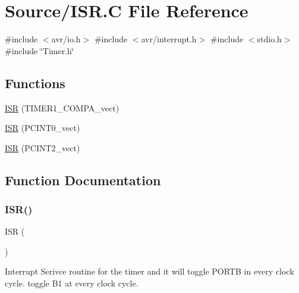\hypertarget{_i_s_r_8_c}{}\section{Source/\+I\+SR.C File Reference}
\label{_i_s_r_8_c}
{\ttfamily \#include $<$avr/io.\+h$>$}\newline
{\ttfamily \#include $<$avr/interrupt.\+h$>$}\newline
{\ttfamily \#include $<$stdio.\+h$>$}\newline
{\ttfamily \#include \char`\"{}Timer.\+h\char`\"{}}\newline
\subsection*{Functions}
\begin{DoxyCompactItemize}
\item 
\mbox{\hyperlink{_i_s_r_8_c_ad39420cdd896dd12c68e36313139d0a5}{I\+SR}} (T\+I\+M\+E\+R1\+\_\+\+C\+O\+M\+P\+A\+\_\+vect)
\item 
\mbox{\hyperlink{_i_s_r_8_c_aa64c6dce15e9de9105b4ae9533c9a267}{I\+SR}} (P\+C\+I\+N\+T0\+\_\+vect)
\item 
\mbox{\hyperlink{_i_s_r_8_c_a9c4665742c6b6eb1f0bb9dde41f7cba3}{I\+SR}} (P\+C\+I\+N\+T2\+\_\+vect)
\end{DoxyCompactItemize}


\subsection{Function Documentation}
\mbox{\label{_i_s_r_8_c_ad39420cdd896dd12c68e36313139d0a5}} 
\subsubsection{\texorpdfstring{ISR()}{ISR()}\hspace{0.1cm}{\footnotesize\ttfamily [1/3]}}
{\footnotesize\ttfamily I\+SR (\begin{DoxyParamCaption}\item[{T\+I\+M\+E\+R1\+\_\+\+C\+O\+M\+P\+A\+\_\+vect}]{ }\end{DoxyParamCaption})}

Interrupt Serivce routine for the timer and it will toggle P\+O\+R\+TB in every clock cycle. toggle B1 at every clock cycle. \mbox{\label{_i_s_r_8_c_aa64c6dce15e9de9105b4ae9533c9a267}} 
